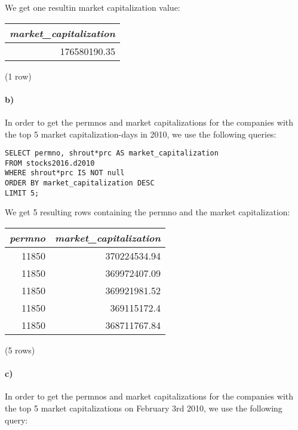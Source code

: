 \documentclass[]{article}
\let\oldparagraph\paragraph
\renewcommand{\paragraph}[1]{\oldparagraph{#1}\mbox{}}
\begin{document}
We get one resultin market capitalization value:

\begin{center}
\begin{tabular}{|r|}
\hline
\textit{market\_capitalization} \\
\hline
176580190.35 \\
\hline
\end{tabular}

\noindent (1 row) \\
\end{center}

\paragraph{b)}
In order to get the permnos and market capitalizations for the companies with the top 5 market capitalization-days in 2010, we use the following queries:

\color{blue}
\begin{verbatim}
SELECT permno, shrout*prc AS market_capitalization
FROM stocks2016.d2010
WHERE shrout*prc IS NOT null
ORDER BY market_capitalization DESC
LIMIT 5;
\end{verbatim}
\color{black}

We get 5 resulting rows containing the permno and the market capitalization:

\begin{center}
\begin{tabular}{|r | r|}
\hline
\textit{permno} & \textit{market\_capitalization} \\
\hline
11850 & 370224534.94 \\
11850 & 369972407.09 \\
11850 & 369921981.52 \\
11850 & 369115172.4 \\
11850 & 368711767.84 \\
\hline
\end{tabular}

\noindent (5 rows) \\
\end{center}

\paragraph{c)}
In order to get the permnos and market capitalizations for the companies with the top 5 market capitalizations on February 3rd 2010, we use the following query:
\end{document}
